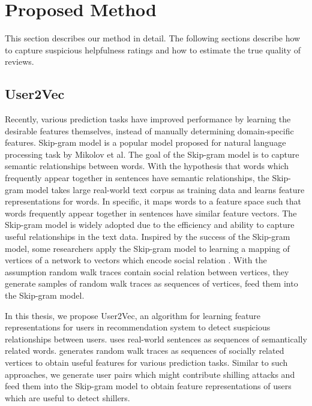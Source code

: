 \documentclass[master,english,final]{kaist-ucs}
\begin{document}
\chapter{Proposed Method}
This section describes our method in detail.
The following sections describe how to capture suspicious helpfulness ratings and how to estimate the true quality of reviews.

\section{User2Vec}
Recently, various prediction tasks \cite{Word2Vec,NegativeSampling,DeepWalk,Node2Vec} have improved performance by learning the desirable features themselves, instead of manually determining domain-specific features.
Skip-gram model \cite{Word2Vec} is a popular model proposed for natural language processing task by Mikolov et al.
The goal of the Skip-gram model is to capture semantic relationships between words.
With the hypothesis that words which frequently appear together in sentences have semantic relationships, the Skip-gram model takes large real-world text corpus as training data and learns feature representations for words.
In specific, it maps words to a feature space such that words frequently appear together in sentences have similar feature vectors.
The Skip-gram model is widely adopted due to the efficiency and ability to capture useful relationships in the text data.
Inspired by the success of the Skip-gram model, some researchers apply the Skip-gram model to learning a mapping of vertices of a network to vectors which encode social relation \cite{DeepWalk,Node2Vec}.
With the assumption random walk traces contain social relation between vertices, they generate samples of random walk traces as sequences of vertices, feed them into the Skip-gram model.

In this thesis, we propose User2Vec, an algorithm for learning feature representations for users in recommendation system to detect suspicious relationships between users.
\cite{Word2Vec} uses real-world sentences as sequences of semantically related words. 
\cite{DeepWalk,Node2Vec} generates random walk traces as sequences of socially related vertices to obtain useful features for various prediction tasks.
Similar to such approaches, we generate user pairs which might contribute shilling attacks and feed them into the Skip-gram model to obtain feature representations of users which are useful to detect shillers.
\end{document}
